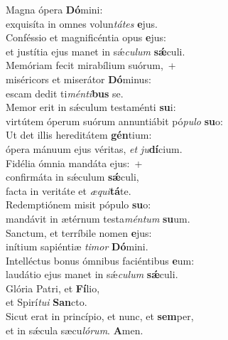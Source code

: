 \evenverse Magna ópera \textbf{Dó}mini:~\*\\
\evenverse exquisíta in omnes volun\textit{tá}\textit{tes} \textbf{e}jus.\\
\oddverse Conféssio et magnificéntia opus \textbf{e}jus:~\*\\
\oddverse et justítia ejus manet in sǽ\textit{cu}\textit{lum} \textbf{sǽ}culi.\\
\evenverse Memóriam fecit mirabílium suórum,~+\\
\evenverse  miséricors et miserátor \textbf{Dó}minus:~\*\\
\evenverse escam dedit ti\textit{mén}\textit{ti}\textbf{bus} se.\\
\oddverse Memor erit in sǽculum testaménti \textbf{su}i:~\*\\
\oddverse virtútem óperum suórum annuntiábit pó\textit{pu}\textit{lo} \textbf{su}o:\\
\evenverse Ut det illis hereditátem \textbf{gén}tium:~\*\\
\evenverse ópera mánuum ejus véritas, \textit{et} \textit{ju}\textbf{dí}cium.\\
\oddverse Fidélia ómnia mandáta ejus:~+\\
\oddverse  confirmáta in sǽculum \textbf{sǽ}culi,~\*\\
\oddverse facta in veritáte et \textit{æ}\textit{qui}\textbf{tá}te.\\
\evenverse Redemptiónem misit pópulo \textbf{su}o:~\*\\
\evenverse mandávit in ætérnum testa\textit{mén}\textit{tum} \textbf{su}um.\\
\oddverse Sanctum, et terríbile nomen \textbf{e}jus:~\*\\
\oddverse inítium sapiéntiæ \textit{ti}\textit{mor} \textbf{Dó}mini.\\
\evenverse Intelléctus bonus ómnibus faciéntibus \textbf{e}um:~\*\\
\evenverse laudátio ejus manet in sǽ\textit{cu}\textit{lum} \textbf{sǽ}culi.\\
\oddverse Glória Patri, et \textbf{Fí}lio,~\*\\
\oddverse et Spirí\textit{tu}\textit{i} \textbf{San}cto.\\
\evenverse Sicut erat in princípio, et nunc, et \textbf{sem}per,~\*\\
\evenverse et in sǽcula sæcu\textit{ló}\textit{rum}. \textbf{A}men.\\
